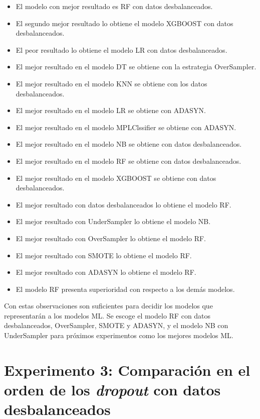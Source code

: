 \begin{itemize}
	\item El modelo con mejor resultado es RF con datos desbalanceados.
	\item El segundo mejor resultado lo obtiene el modelo XGBOOST con datos desbalanceados.
	\item El peor resultado lo obtiene el modelo LR con datos desbalanceados.
	\item El mejor resultado en el modelo DT se obtiene con la estrategia OverSampler.
	\item El mejor resultado en el modelo KNN se obtiene con los datos desbalanceados.
	\item El mejor resultado en el modelo LR se obtiene con ADASYN.
	\item El mejor resultado en el modelo MPLClssifier se obtiene con ADASYN.
	\item El mejor resultado en el modelo NB se obtiene con datos desbalanceados.
	\item El mejor resultado en el modelo RF se obtiene con datos desbalanceados.
	\item El mejor resultado en el modelo XGBOOST se obtiene con datos desbalanceados.
	\item El mejor resultado con datos desbalanceados lo obtiene el modelo RF.
	\item El mejor resultado con UnderSampler lo obtiene el modelo NB.
	\item El mejor resultado con OverSampler lo obtiene el modelo RF.
	\item El mejor resultado con SMOTE lo obtiene el modelo RF.
	\item El mejor resultado con ADASYN lo obtiene el modelo RF.
	\item El modelo RF presenta superioridad con respecto a los dem\'{a}s modelos.
\end{itemize}

Con estas observaciones son suficientes para decidir los modelos que representar\'{a}n a los modelos ML. Se escoge el modelo RF con datos desbalanceados, OverSampler, SMOTE y ADASYN, y el modelo NB con UnderSampler para pr\'{o}ximos experimentos como los mejores modelos ML.

\section{Experimento 3: Comparaci\'{o}n en el orden de los \textit{dropout} con datos desbalanceados}

